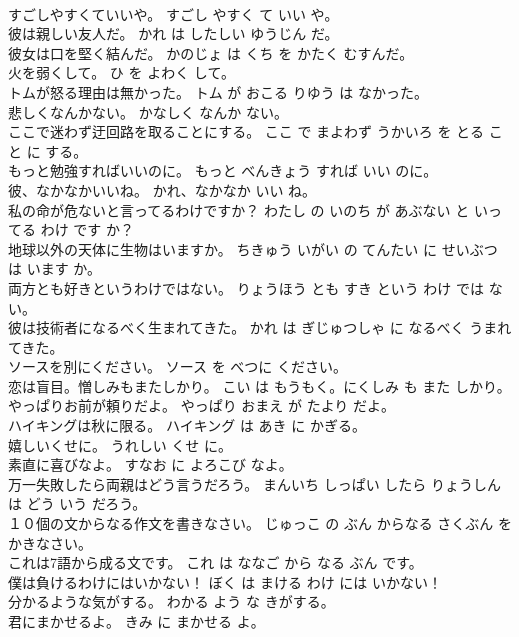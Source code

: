 \documentclass[8pt]{extreport}
\begin{document}
\begin{CJK}{UTF8}{min}
\\	すごしやすくていいや。	すごし やすく て いい や。	
\\	彼は親しい友人だ。	かれ は したしい ゆうじん だ。	
\\	彼女は口を堅く結んだ。	かのじょ は くち を かたく むすんだ。	
\\	火を弱くして。	ひ を よわく して。	
\\	トムが怒る理由は無かった。	トム が おこる りゆう は なかった。	
\\	悲しくなんかない。	かなしく なんか ない。	
\\	ここで迷わず迂回路を取ることにする。	ここ で まよわず うかいろ を とる こと に する。	
\\	もっと勉強すればいいのに。	もっと べんきょう すれば いい のに。	
\\	彼、なかなかいいね。	かれ、なかなか いい ね。	
\\	私の命が危ないと言ってるわけですか？	わたし の いのち が あぶない と いってる わけ です か？	
\\	地球以外の天体に生物はいますか。	ちきゅう いがい の てんたい に せいぶつ は います か。	
\\	両方とも好きというわけではない。	りょうほう とも すき という わけ では ない。	
\\	彼は技術者になるべく生まれてきた。	かれ は ぎじゅつしゃ に なるべく うまれてきた。	
\\	ソースを別にください。	ソース を べつに ください。	
\\	恋は盲目。憎しみもまたしかり。	こい は もうもく。にくしみ も また しかり。	
\\	やっぱりお前が頼りだよ。	やっぱり おまえ が たより だよ。	
\\	ハイキングは秋に限る。	ハイキング は あき に かぎる。	
\\	嬉しいくせに。	うれしい くせ に。	
\\	素直に喜びなよ。	すなお に よろこび なよ。	
\\	万一失敗したら両親はどう言うだろう。	まんいち しっぱい したら りょうしん は どう いう だろう。	
\\	１０個の文からなる作文を書きなさい。	じゅっこ の ぶん からなる さくぶん を かきなさい。	
\\	これは7語から成る文です。	これ は ななご から なる ぶん です。	
\\	僕は負けるわけにはいかない！	ぼく は まける わけ には いかない！	
\\	分かるような気がする。	わかる よう な きがする。	
\\	君にまかせるよ。	きみ に まかせる よ。	

\end{CJK}
\end{document}
